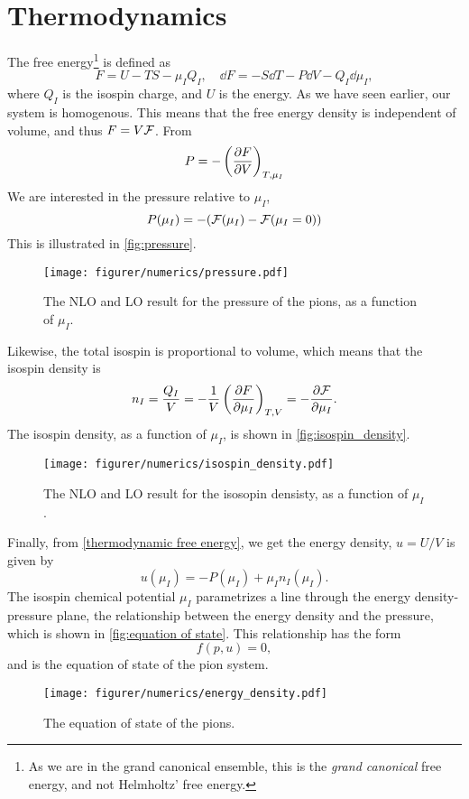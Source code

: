 \section{Thermodynamics}
The free energy\footnote{As we are in the grand canonical ensemble, this is the \emph{grand canonical} free energy, and not Helmholtz' free energy.}
is defined as
\begin{equation}
    \label{thermodynamic free energy}
    F = U - TS - \mu_I Q_I, \quad \dd F = - S \dd T - P \dd V - Q_I \dd \mu_I ,
\end{equation}
where $Q_I$ is the isospin charge, and $U$ is the energy.
As we have seen earlier, our system is homogenous.
This means that the free energy density is independent of volume, and thus $F = V \mathcal{F}$.
From 
\begin{equation}
    P = - \left(\diffp{F}{V}\right)_{T, \mu_I}
\end{equation}
We are interested in the pressure relative to $\mu_I$, 
\begin{equation}
    P(\mu_I) = -(\mathcal{F}(\mu_I) - \mathcal{F}(\mu_I = 0))
\end{equation}
This is illustrated in \autoref{fig:pressure}.
\begin{figure}[ht]
    \centering
    \texttt{[image: figurer/numerics/pressure.pdf]}
    \caption{The NLO and LO result for the pressure of the pions, as a function of $\mu_I$.}
    \label{fig:pressure}
\end{figure}
Likewise, the total isospin is proportional to volume, which means that the isospin density is
\begin{equation}
    n_I = \frac{Q_I}{V} = - \frac{1}{V} \left(\diffp{F}{\mu_I}\right)_{T, V}
    = - \diffp{\Ef}{\mu_I}.
\end{equation}
The isospin density, as a function of $\mu_I$, is shown in \autoref{fig:isospin_density}.
\begin{figure}
    \centering
    \texttt{[image: figurer/numerics/isospin\_density.pdf]}
    \caption{The NLO and LO result for the isosopin densisty, as a function of $\mu_I$.}
    \label{fig:isospin_density}
\end{figure}
Finally, from \cref{thermodynamic free energy}, we get the energy density, $u = U/V$ is given by
\begin{equation}
    u(\mu_I) = -P(\mu_I) + \mu_I n_I(\mu_I).
\end{equation}
The isospin chemical potential $\mu_I$ parametrizes a line through the energy density-pressure plane, the relationship between the energy density and the pressure, which is shown in \autoref{fig:equation of state}.
This relationship has the form
\begin{equation}
    f(p, u) = 0,
\end{equation}
and is the equation of state of the pion system.


\begin{figure}[ht]
    \centering
    \texttt{[image: figurer/numerics/energy\_density.pdf]}
    \caption{The equation of state of the pions.}
    \label{fig:equation of state}
\end{figure}
